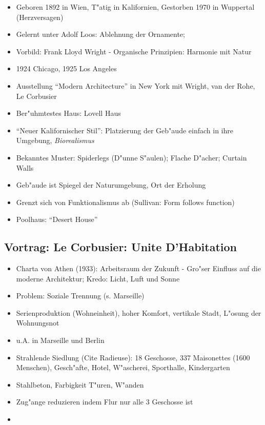 \documentclass[emulatestandardclasses]{scrartcl}
\begin{document}
\begin{itemize}
  \item Geboren 1892 in Wien, T"atig in Kalifornien, Gestorben 1970 in Wuppertal (Herzversagen)
  \item Gelernt unter Adolf Loos: Ablehnung der Ornamente; 
  \item Vorbild: Frank Lloyd Wright - Organische Prinzipien: Harmonie mit Natur
  \item 1924 Chicago, 1925 Los Angeles
  \item Ausstellung "`Modern Architecture"' in New York mit Wright, van der Rohe, Le Corbusier
  \item Ber"uhmtestes Haus: Lovell Haus
  \item "`Neuer Kalifornischer Stil"': Platzierung der Geb"aude einfach in ihre Umgebung, \emph{Biorealismus}
  \item Bekanntes Muster: Spiderlegs (D"unne S"aulen); Flache D"acher; Curtain Walls
  \item Geb"aude ist Spiegel der Naturumgebung, Ort der Erholung
  \item Grenzt sich von Funktionalismus ab (Sullivan: Form follows function)
  \item Poolhaus: "`Desert House"'
\end{itemize}


\subsection{Vortrag: Le Corbusier: Unite D'Habitation}

\begin{itemize}
  \item Charta von Athen (1933): Arbeitsraum der Zukunft - Gro"ser Einfluss auf die moderne Architektur; Kredo: Licht, Luft und Sonne
  \item Problem: Soziale Trennung (s. Marseille)
  \item Serienproduktion (Wohneinheit), hoher Komfort, vertikale Stadt, L"osung der Wohnungsnot
  \item u.A. in Marseille und Berlin
  \item Strahlende Siedlung (Cite Radieuse): 18 Geschosse, 337 Maisonettes (1600 Menschen), Gesch"afte, Hotel, W"ascherei, Sporthalle, Kindergarten
  \item Stahlbeton, Farbigkeit T"uren, W"anden
  \item Zug"ange reduzieren indem Flur nur alle 3 Geschosse ist
  \item 
\end{itemize}
\end{document}
